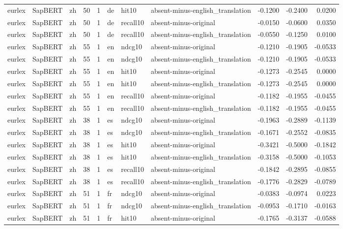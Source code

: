 \begin{tabular}{lllrrlllrrr}
eurlex & SapBERT & zh & 50 & 1 & de & hit10 & absent-minus-english\_translation & -0.1200 & -0.2400 & 0.0200 \\
eurlex & SapBERT & zh & 50 & 1 & de & recall10 & absent-minus-original & -0.0150 & -0.0600 & 0.0350 \\
eurlex & SapBERT & zh & 50 & 1 & de & recall10 & absent-minus-english\_translation & -0.0550 & -0.1250 & 0.0100 \\
eurlex & SapBERT & zh & 55 & 1 & en & ndcg10 & absent-minus-original & -0.1210 & -0.1905 & -0.0533 \\
eurlex & SapBERT & zh & 55 & 1 & en & ndcg10 & absent-minus-english\_translation & -0.1210 & -0.1905 & -0.0533 \\
eurlex & SapBERT & zh & 55 & 1 & en & hit10 & absent-minus-original & -0.1273 & -0.2545 & 0.0000 \\
eurlex & SapBERT & zh & 55 & 1 & en & hit10 & absent-minus-english\_translation & -0.1273 & -0.2545 & 0.0000 \\
eurlex & SapBERT & zh & 55 & 1 & en & recall10 & absent-minus-original & -0.1182 & -0.1955 & -0.0455 \\
eurlex & SapBERT & zh & 55 & 1 & en & recall10 & absent-minus-english\_translation & -0.1182 & -0.1955 & -0.0455 \\
eurlex & SapBERT & zh & 38 & 1 & es & ndcg10 & absent-minus-original & -0.1963 & -0.2889 & -0.1139 \\
eurlex & SapBERT & zh & 38 & 1 & es & ndcg10 & absent-minus-english\_translation & -0.1671 & -0.2552 & -0.0835 \\
eurlex & SapBERT & zh & 38 & 1 & es & hit10 & absent-minus-original & -0.3421 & -0.5000 & -0.1842 \\
eurlex & SapBERT & zh & 38 & 1 & es & hit10 & absent-minus-english\_translation & -0.3158 & -0.5000 & -0.1053 \\
eurlex & SapBERT & zh & 38 & 1 & es & recall10 & absent-minus-original & -0.1842 & -0.2895 & -0.0855 \\
eurlex & SapBERT & zh & 38 & 1 & es & recall10 & absent-minus-english\_translation & -0.1776 & -0.2829 & -0.0789 \\
eurlex & SapBERT & zh & 51 & 1 & fr & ndcg10 & absent-minus-original & -0.0383 & -0.0974 & 0.0223 \\
eurlex & SapBERT & zh & 51 & 1 & fr & ndcg10 & absent-minus-english\_translation & -0.0953 & -0.1710 & -0.0163 \\
eurlex & SapBERT & zh & 51 & 1 & fr & hit10 & absent-minus-original & -0.1765 & -0.3137 & -0.0588 \\

\end{tabular}
